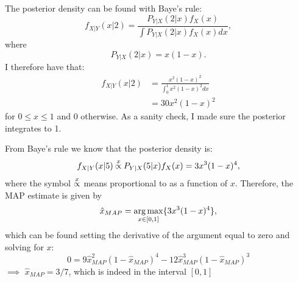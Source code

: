 \begin{problem}{1} The posterior density can be found with Baye's rule:
\begin{equation*}
f_{X|Y}(x|2) = \frac{P_{Y|X}(2|x)f_X(x)}{\int P_{Y|X}(2|x)f_X(x)dx},
\end{equation*}
where
\begin{equation*}
P_{Y|X}(2|x) = x(1-x).
\end{equation*}
I therefore have that:
\begin{align*}
f_{X|Y}(x|2) &=\frac{x^2(1-x)^2}{\int_0^1 x^2(1-x)^2 dx} \\
& = 30 x^2(1-x)^2
\end{align*}
for $0\le x \le1$ and 0 otherwise.  As a sanity check, I made sure the posterior integrates to 1.

\end{problem}

\begin{problem}{2} From Baye's rule we know that the posterior density is:
\begin{equation*}
f_{X|Y}(x|5) \propof{x} P_{Y|X}(5|x)f_X(x) = 3x^3(1-x)^4,
\end{equation*}
where the symbol $\propof{x}$ means proportional to as a function of $x$.  Therefore, the MAP estimate is given by
\begin{equation*}
\hat x_{MAP} = \operatorname*{arg\,max}_{x \in [0, 1]}  \{3x^3(1-x)^4 \},
\end{equation*}
which can be found setting the derivative of the argument equal to zero and solving for $x$:
\begin{equation*}
0 = 9\hat x_{MAP}^2(1-\hat x_{MAP})^4-12\hat x_{MAP}^3(1-\hat x_{MAP})^3
\end{equation*}
$\implies$ $\hat x_{MAP} = 3/7$, which is indeed in the interval $[0, 1]$


\end{problem}

